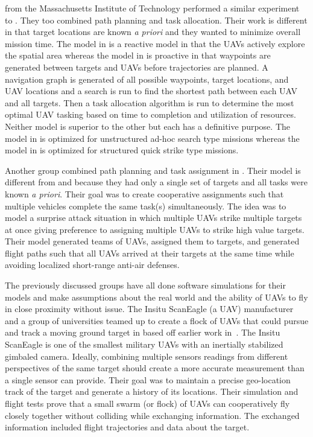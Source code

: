 \citet{bellingham} from the Massachusetts Institute of Technology performed a similar experiment to \citet{jin}.   They too combined path planning and task allocation.  Their work is different in that target locations are known \textit{a priori} and they wanted to minimize overall mission time.  The model in \citet{jin} is a reactive model in that the UAVs actively explore the spatial area whereas the model in \citet{bellingham} is proactive in that waypoints are generated between targets and UAVs before trajectories are planned.  A navigation graph is generated of all possible waypoints, target locations, and UAV locations and a search is run to find the shortest path between each UAV and all targets.  Then a task allocation algorithm is run to determine the most optimal UAV tasking based on time to completion and utilization of resources.  Neither model is superior to the other but each has a definitive purpose.  The model in \citet{jin} is optimized for unstructured ad-hoc search type missions whereas the model in \citet{bellingham} is optimized for structured quick strike type missions.

Another group combined path planning and task assignment in \citet{beard}.  Their model is different from \citet{jin} and \citet{bellingham} because they had only a single set of targets and all tasks were known \textit{a priori}.  Their goal was to create cooperative assignments such that multiple vehicles complete the same task(s) simultaneously.  The idea was to model a surprise attack situation in which multiple UAVs strike multiple targets at once giving preference to assigning multiple UAVs to strike high value targets.  Their model generated teams of UAVs, assigned them to targets, and generated flight paths such that all UAVs arrived at their targets at the same time while avoiding localized short-range anti-air defenses.

The previously discussed groups have all done software simulations for their models and make assumptions about the real world and the ability of UAVs to fly in close proximity without issue.  The Insitu ScanEagle (a UAV) manufacturer and a group of universities teamed up to create a flock of UAVs that could pursue and track a moving ground target in \citet{wheeler} based off earlier work in~\citet{wise_rolf}.  The Insitu ScanEagle is one of the smallest military UAVs with an inertially stabilized gimbaled camera.  Ideally, combining multiple sensors readings from different perspectives of the same target should create a more accurate measurement than a single sensor can provide.  Their goal was to maintain a precise geo-location track of the target and generate a history of its locations.  Their simulation and flight tests prove that a small swarm (or flock) of UAVs can cooperatively fly closely together without colliding while exchanging information.  The exchanged information included flight trajectories and data about the target. 

